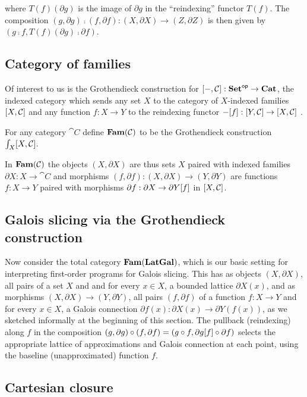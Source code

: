 \noindent where $T(f)(\partial g)$ is the image of $\partial g$ in the ``reindexing'' functor $T(f)$. The
composition $(g, \partial g) \comp (f, \partial f): (X, \partial X) \to (Z, \partial Z)$ is then given by $(g
\comp f, T(f)(\partial g) \comp \partial f)$.

\subsection{Category of families}
\label{sec:Fam}

Of interest to us is the Grothendieck construction for $[-,\mathcal{C}]: \mathbf{Set}^{\mathsf{op}} \to \mathbf{Cat}$, the indexed
category which sends any set $X$ to the category of $X$-indexed families $[X,\mathcal{C}]$ and any function
$f: X \to Y$ to the reindexing functor $-[f]: [Y,\mathcal{C}] \to [X,\mathcal{C}]$ .

\begin{definition}
\label{def:Fam}
For any category $\cat{C}$ define $\mathbf{Fam}(\mathcal{C})$ to be the Grothendieck construction
$\int_{X}[X,\mathcal{C}]$.
\end{definition}

\noindent In $\mathbf{Fam}(\mathcal{C})$ the objects $(X, \partial X)$ are thus sets $X$ paired with indexed families
$\partial X: X \to \cat{C}$ and morphisms $(f, \partial f): (X, \partial X) \to (Y, \partial Y)$ are functions
$f: X \to Y$ paired with morphisms $\partial f: \partial X \to \partial Y[f]$ in
$[X,\mathcal{C}]$.

\subsection{Galois slicing via the Grothendieck construction}

Now consider the total category $\mathbf{Fam}(\mathbf{LatGal})$, which is our basic setting for interpreting first-order
programs for Galois slicing. This has as objects $(X, \partial X)$, all pairs of a set $X$ and and for every
$x \in X$, a bounded lattice $\partial X(x)$, and as morphisms $(X, \partial X) \to (Y, \partial Y)$, all
pairs $(f, \partial f)$ of a function $f: X \to Y$ and for every $x \in X$, a Galois connection $\partial
f(x): \partial X(x) \to \partial Y(f(x))$, as we sketched informally at the beginning of this section. The
pullback (reindexing) along $f$ in the composition $(g, \partial g) \circ (f, \partial f) = (g \circ f,
\partial g[f] \circ \partial f)$ selects the appropriate lattice of approximations and Galois
connection at each point, using the baseline (unapproximated) function $f$.

\subsection{Cartesian closure}

